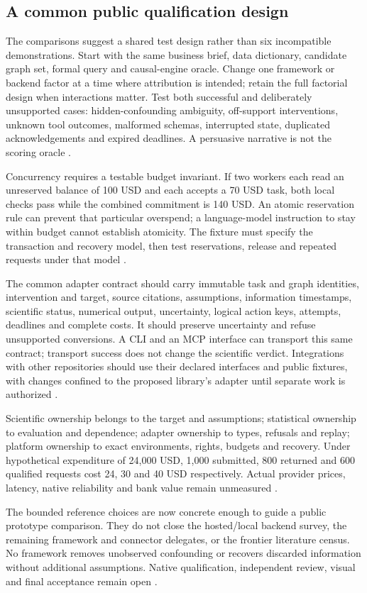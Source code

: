 \subsection{A common public qualification design}
The comparisons suggest a shared test design rather than six incompatible
demonstrations. Start with the same business brief, data dictionary,
candidate graph set, formal query and causal-engine oracle. Change one
framework or backend factor at a time where attribution is intended;
retain the full factorial design when interactions matter. Test both
successful and deliberately unsupported cases: hidden-confounding
ambiguity, off-support interventions, unknown tool outcomes, malformed
schemas, interrupted state, duplicated acknowledgements and expired
deadlines. A persuasive narrative is not the scoring oracle
\cite{exec24_framework_contracts}.

Concurrency requires a testable budget invariant. If two workers each
read an unreserved balance of 100 USD and each accepts a 70 USD task,
both local checks pass while the combined commitment is 140 USD.
An atomic reservation rule can prevent that particular overspend;
a language-model instruction to stay within budget cannot establish
atomicity. The fixture must specify the transaction and recovery model,
then test reservations, release and repeated requests under that model
\cite{exec24_framework_contracts}.

The common adapter contract should carry immutable task and graph
identities, intervention and target, source citations, assumptions,
information timestamps, scientific status, numerical output, uncertainty,
logical action keys, attempts, deadlines and complete costs. It should
preserve uncertainty and refuse unsupported conversions. A CLI and an MCP
interface can transport this same contract; transport success does not
change the scientific verdict. Integrations with other repositories should
use their declared interfaces and public fixtures, with changes confined
to the proposed library's adapter until separate work is authorized
\cite{exec24_framework_contracts}.

Scientific ownership belongs to the target and assumptions; statistical
ownership to evaluation and dependence; adapter ownership to types,
refusals and replay; platform ownership to exact environments, rights,
budgets and recovery. Under hypothetical expenditure of 24,000 USD,
1,000 submitted, 800 returned and 600 qualified requests cost 24, 30 and
40 USD respectively. Actual provider prices, latency, native reliability
and bank value remain unmeasured
\cite{exec24_framework_contracts}.

The bounded reference choices are now concrete enough to guide a public
prototype comparison. They do not close the hosted/local backend survey,
the remaining framework and connector delegates, or the frontier literature
census. No framework removes unobserved confounding or recovers discarded
information without additional assumptions. Native qualification,
independent review, visual and final acceptance remain open
\cite{exec24_framework_contracts}.
